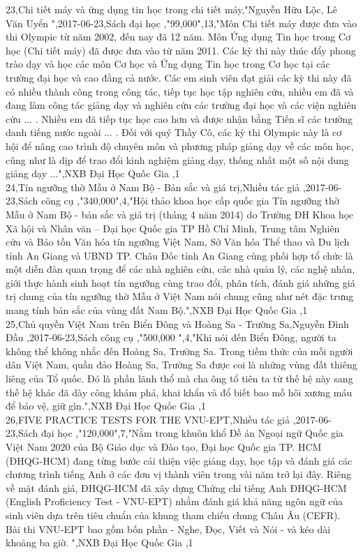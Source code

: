 \documentclass[a4paper]{article}
\begin{document}
23,Chi tiết máy và ứng dụng tin học trong chi tiết máy,"Nguyễn Hữu Lộc, Lê Văn Uyển ",2017-06-23,Sách đại học ,"99,000",13,"Môn Chi tiết máy được đưa vào thi Olympic từ năm 2002, đến nay đã 12 năm. Môn Ứng dụng Tin học trong Cơ học (Chi tiết máy) đã được đưa vào từ năm 2011. Các kỳ thi này thúc đẩy phong trào dạy và học các môn Cơ học và Ứng dụng Tin học trong Cơ học tại các trường đại học và cao đẳng cả nước. Các em sinh viên đạt giải các kỳ thi này đã có nhiều thành công trong công tác, tiếp tục học tập nghiên cứu, nhiều em đã và đang làm công tác giảng dạy và nghiên cứu các trường đại học và các viện nghiên cứu ... . Nhiều em đã tiếp tục học cao hơn và được nhận bằng Tiến sĩ các trường danh tiếng nước ngoài ... . Đối với quý Thầy Cô, các kỳ thi Olympic này là cơ hội để nâng cao trình độ chuyên môn và phương pháp giảng dạy về các môn học, cũng như là dịp để trao đổi kinh nghiệm giảng dạy, thống nhất một số nội dung giảng dạy ...",NXB Đại Học Quốc Gia ,1\\
24,Tín ngưỡng thờ Mẫu ở Nam Bộ - Bản sắc và giá trị,Nhiều tác giả ,2017-06-23,Sách công cụ ,"340,000",4,"Hội thảo khoa học cấp quốc gia Tín ngưỡng thờ Mẫu ở Nam Bộ - bản sắc và giá trị (tháng 4 năm 2014) do Trường ĐH Khoa học Xã hội và Nhân văn – Đại học Quốc gia TP Hồ Chí Minh, Trung tâm Nghiên cứu và Bảo tồn Văn hóa tín ngưỡng Việt Nam, Sở Văn hóa Thể thao và Du lịch tỉnh An Giang và UBND TP. Châu Đốc tỉnh An Giang cùng phối hợp tổ chức là một diễn đàn quan trọng để các nhà nghiên cứu, các nhà quản lý, các nghệ nhân, giới thực hành sinh hoạt tín ngưỡng cùng trao đổi, phân tích, đánh giá những giá trị chung của tín ngưỡng thờ Mẫu ở Việt Nam nói chung cũng như nét đặc trưng mang tính bản sắc của vùng đất Nam Bộ.",NXB Đại Học Quốc Gia ,1\\
25,Chủ quyền Việt Nam trên Biển Đông và Hoàng Sa - Trường Sa,Nguyễn Đình Đầu ,2017-06-23,Sách công cụ ,"500,000 ",4,"Khi nói đến Biển Đông, người ta không thể không nhắc đến Hoàng Sa, Trường Sa. Trong tiềm thức của mỗi người dân Việt Nam, quần đảo Hoàng Sa, Trường Sa được coi là những vùng đất thiêng liêng của Tổ quốc. Đó là phần lãnh thổ mà cha ông tổ tiên ta từ thế hệ này sang thế hệ khác đã dày công khám phá, khai khẩn và đổ biết bao mồ hôi xương máu để bảo vệ, giữ gìn.",NXB Đại Học Quốc Gia ,1\\
26,FIVE PRACTICE TESTS FOR THE VNU-EPT,Nhiều tác giả ,2017-06-23,Sách đại học ,"120,000",7,"Nằm trong khuôn khổ Đề án Ngoại ngữ Quốc gia Việt Nam 2020 của Bộ Giáo dục và Đào tạo, Đại học Quốc gia TP. HCM (ĐHQG-HCM) đang từng bước cải thiện việc giảng dạy, học tập và đánh giá các chương trình tiếng Anh ở các đơn vị thành viên trong vài năm trở lại đây. Riêng về mặt đánh giá, ĐHQG-HCM đã xây dựng Chứng chỉ tiếng Anh ĐHQG-HCM (English Proficiency Test - VNU-EPT) nhằm đánh giá khả năng ngôn ngữ của sinh viên dựa trên tiêu chuẩn của khung tham chiếu chung Châu Âu (CEFR). Bài thi VNU-EPT bao gồm bốn phần - Nghe, Đọc, Viết và Nói - và kéo dài khoảng ba giờ. ",NXB Đại Học Quốc Gia ,1\\
\end{document}

